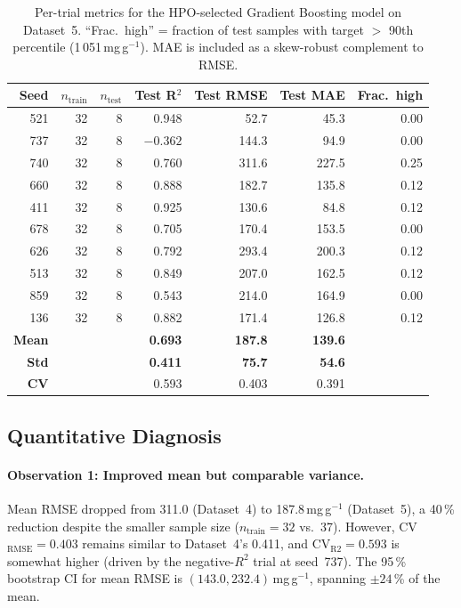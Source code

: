 \documentclass[12pt,a4paper]{article}
\begin{document}
\begin{table}[h]
\centering
\caption{Per-trial metrics for the HPO-selected Gradient Boosting model on
  Dataset~5.  ``Frac.\ high'' = fraction of test samples with
  target $>$ 90th percentile (1\,051\,mg\,g$^{-1}$).
  MAE is included as a skew-robust complement to RMSE.}
\label{tab:ds5_per_trial}
\small
\begin{tabular}{rrrrrrr}
\toprule
Seed & $n_\text{train}$ & $n_\text{test}$ & Test R$^2$ & Test RMSE & Test MAE & Frac.\ high \\
\midrule
521  & 32 & 8 &  0.948 &  52.7 &  45.3 & 0.00 \\
737  & 32 & 8 & $-0.362$ & 144.3 &  94.9 & 0.00 \\
740  & 32 & 8 &  0.760 & 311.6 & 227.5 & 0.25 \\
660  & 32 & 8 &  0.888 & 182.7 & 135.8 & 0.12 \\
411  & 32 & 8 &  0.925 & 130.6 &  84.8 & 0.12 \\
678  & 32 & 8 &  0.705 & 170.4 & 153.5 & 0.00 \\
626  & 32 & 8 &  0.792 & 293.4 & 200.3 & 0.12 \\
513  & 32 & 8 &  0.849 & 207.0 & 162.5 & 0.12 \\
859  & 32 & 8 &  0.543 & 214.0 & 164.9 & 0.00 \\
136  & 32 & 8 &  0.882 & 171.4 & 126.8 & 0.12 \\
\midrule
\textbf{Mean} & & & \textbf{0.693} & \textbf{187.8} & \textbf{139.6} & \\
\textbf{Std}  & & & \textbf{0.411} & \textbf{75.7}  & \textbf{54.6}  & \\
\textbf{CV}   & & & 0.593          & 0.403           & 0.391           & \\
\bottomrule
\end{tabular}
\end{table}

\subsection{Quantitative Diagnosis}

\paragraph{Observation 1: Improved mean but comparable variance.}
Mean RMSE dropped from 311.0 (Dataset~4) to 187.8\,mg\,g$^{-1}$
(Dataset~5), a 40\,\% reduction despite the smaller sample size
($n_\text{train}=32$ vs.\ 37).  However, CV$_\text{RMSE}=0.403$
remains similar to Dataset~4's 0.411, and CV$_\text{R2}=0.593$ is
somewhat higher (driven by the negative-$R^2$ trial at seed~737).
The 95\,\% bootstrap CI for mean RMSE is $(143.0, 232.4)$\,mg\,g$^{-1}$,
spanning $\pm 24$\,\% of the mean.
\end{document}
